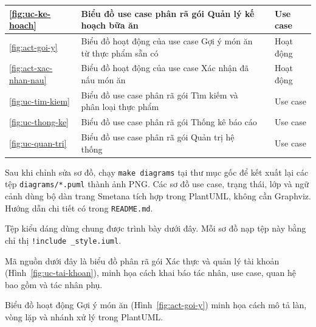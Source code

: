 {\begin{longtable}{|C{1.3cm}|L{\dimexpr{}\arrayrulewidth-1.3cm-5.6cm-2.4cm\relax}|L{5.6cm}|L{2.4cm}|}
\ref{fig:uc-ke-hoach} & Biểu đồ use case phân rã gói Quản lý kế hoạch bữa ăn &  & Use case\\ \hline
\ref{fig:act-goi-y} & Biểu đồ hoạt động của use case Gợi ý món ăn từ thực phẩm sẵn có &  & Hoạt động\\ \hline
\ref{fig:act-xac-nhan-nau} & Biểu đồ hoạt động của use case Xác nhận đã nấu món ăn &  & Hoạt động\\ \hline
\ref{fig:uc-tim-kiem} & Biểu đồ use case phân rã gói Tìm kiếm và phân loại thực phẩm &  & Use case\\ \hline
\ref{fig:uc-thong-ke} & Biểu đồ use case phân rã gói Thống kê báo cáo &  & Use case\\ \hline
\ref{fig:uc-quan-tri} & Biểu đồ use case phân rã gói Quản trị hệ thống &  & Use case\\ \hline
\end{longtable}
}

Sau khi chỉnh sửa sơ đồ, chạy \texttt{make diagrams} tại thư mục gốc để kết xuất lại các tệp \texttt{diagrams/*.puml} thành ảnh PNG. Các sơ đồ use case, trạng thái, lớp và ngữ cảnh dùng bộ dàn trang Smetana tích hợp trong PlantUML, không cần Graphviz. Hướng dẫn chi tiết có trong \texttt{README.md}.

Tệp kiểu dáng dùng chung được trình bày dưới đây. Mỗi sơ đồ nạp tệp này bằng chỉ thị \texttt{!include \_style.iuml}.


Mã nguồn dưới đây là biểu đồ phân rã gói Xác thực và quản lý tài khoản (Hình~\ref{fig:uc-tai-khoan}), minh họa cách khai báo tác nhân, use case, quan hệ bao gồm và tác nhân phụ.


Biểu đồ hoạt động Gợi ý món ăn (Hình~\ref{fig:act-goi-y}) minh họa cách mô tả làn, vòng lặp và nhánh xử lý trong PlantUML.

